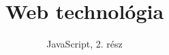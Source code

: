 \documentclass[usenames,dvipsnames,aspectratio=169]{beamer}
\title[Web technológiák - JavaScript]{Web technológia}
\subtitle{JavaScript, 2. rész}
\begin{document}
\begin{frame}[plain]
  \titlepage
  \logoalul
\end{frame}



\end{document}
